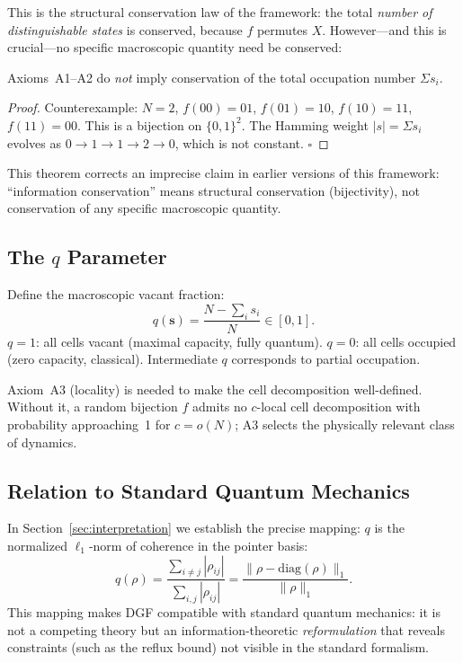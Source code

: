 \documentclass[reprint]{revtex4-2}
\begin{document}
This is the structural conservation law of the framework: the total \emph{number of distinguishable states} is conserved, because $f$ permutes $X$. However---and this is crucial---no specific macroscopic quantity need be conserved:

\begin{theorem}
\label{thm:nonconservation}
Axioms~A1--A2 do \emph{not} imply conservation of the total occupation number $\Sigma s_i$.
\end{theorem}
\begin{proof}
Counterexample: $N=2$, $f(00)=01$, $f(01)=10$, $f(10)=11$, $f(11)=00$. This is a bijection on $\{0,1\}^2$. The Hamming weight $|s|=\Sigma s_i$ evolves as $0\to 1\to 1\to 2\to 0$, which is not constant. $\square$
\end{proof}

This theorem corrects an imprecise claim in earlier versions of this framework: ``information conservation'' means structural conservation (bijectivity), not conservation of any specific macroscopic quantity.

\subsection{The $q$ Parameter}

Define the macroscopic vacant fraction:
\begin{equation}
q(\mathbf{s}) = \frac{N-\sum_i s_i}{N}\in[0,1].
\end{equation}
$q=1$: all cells vacant (maximal capacity, fully quantum). $q=0$: all cells occupied (zero capacity, classical). Intermediate $q$ corresponds to partial occupation.

Axiom~A3 (locality) is needed to make the cell decomposition well-defined. Without it, a random bijection $f$ admits no $c$-local cell decomposition with probability approaching~1 for $c=o(N)$; A3 selects the physically relevant class of dynamics.

\subsection{Relation to Standard Quantum Mechanics}

In Section~\ref{sec:interpretation} we establish the precise mapping: $q$ is the normalized $\ell_1$-norm of coherence in the pointer basis:
\begin{equation}
q(\rho) = \frac{\sum_{i\neq j}|\rho_{ij}|}{\sum_{i,j}|\rho_{ij}|} = \frac{\|\rho-\mathrm{diag}(\rho)\|_1}{\|\rho\|_1}.
\end{equation}
This mapping makes DGF compatible with standard quantum mechanics: it is not a competing theory but an information-theoretic \emph{reformulation} that reveals constraints (such as the reflux bound) not visible in the standard formalism.
\end{document}
